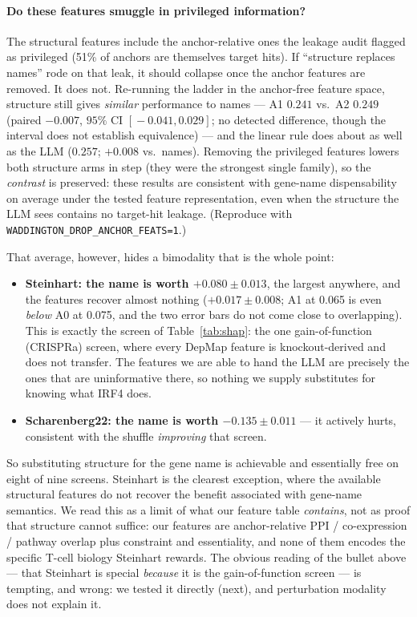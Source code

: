 \documentclass[11pt]{article}
\begin{document}
\paragraph{Do these features smuggle in privileged information?} The structural features include the
anchor-relative ones the leakage audit flagged as privileged (51\% of anchors are themselves target
hits). If ``structure replaces names'' rode on that leak, it should collapse once the anchor features are
removed. It does not. Re-running the ladder in the anchor-free feature space, structure still gives
\emph{similar} performance to names --- A1 $0.241$ vs.\ A2 $0.249$ (paired $-0.007$, $95\%$ CI
$[\!-\!0.041, 0.029]$; no detected difference, though the interval does not establish equivalence) --- and
the linear rule does about as well as the LLM ($0.257$; $+0.008$ vs.\ names). Removing the privileged
features lowers both structure arms in step (they were the strongest single family), so the
\emph{contrast} is preserved: these results are consistent with gene-name dispensability on average under
the tested feature representation, even when the structure the LLM sees contains no target-hit leakage.
(Reproduce with \texttt{WADDINGTON\_DROP\_ANCHOR\_FEATS=1}.)

\noindent
That average, however, hides a bimodality that is the whole point:

\begin{itemize}\itemsep2pt
  \item \textbf{Steinhart: the name is worth $+0.080 \pm 0.013$}, the largest anywhere, and the
  features recover almost nothing ($+0.017 \pm 0.008$; A1 at 0.065 is even \emph{below} A0 at 0.075,
  and the two error bars do not come close to overlapping). This is exactly the screen of
  Table~\ref{tab:shap}: the one gain-of-function (CRISPRa) screen, where every DepMap feature is
  knockout-derived and does not transfer. The features we are able to hand the LLM are precisely the
  ones that are uninformative there, so nothing we supply substitutes for knowing what IRF4 does.
  \item \textbf{Scharenberg22: the name is worth $-0.135 \pm 0.011$} --- it actively hurts, consistent
  with the shuffle \emph{improving} that screen.
\end{itemize}

\noindent
So substituting structure for the gene name is achievable and essentially free on eight of nine
screens. Steinhart is the clearest exception, where the available structural features do not recover the
benefit associated with gene-name semantics. We read this as a limit of
what our feature table \emph{contains}, not as proof that structure cannot suffice: our features are
anchor-relative PPI / co-expression / pathway overlap plus constraint and essentiality, and none of
them encodes the specific T-cell biology Steinhart rewards. The obvious reading of the bullet above ---
that Steinhart is special \emph{because} it is the gain-of-function screen --- is tempting, and wrong:
we tested it directly (next), and perturbation modality does not explain it.
\end{document}
